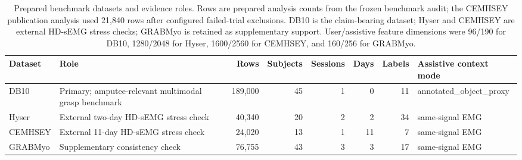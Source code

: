 \begin{table}[!t]
\centering
\caption{Prepared benchmark datasets and evidence roles. Rows are prepared analysis counts from the frozen benchmark audit; the CEMHSEY publication analysis used 21{,}840 rows after configured failed-trial exclusions. DB10 is the claim-bearing dataset; Hyser and CEMHSEY are external HD-sEMG stress checks; GRABMyo is retained as supplementary support. User/assistive feature dimensions were 96/190 for DB10, 1280/2048 for Hyser, 1600/2560 for CEMHSEY, and 160/256 for GRABMyo.}
\label{tab:datasets}
\footnotesize
\begin{tabular}{p{}p{}rrrrrp{}}
\toprule
Dataset & Role & Rows & Subjects & Sessions & Days & Labels & Assistive context mode \\
\midrule
DB10 & Primary; amputee-relevant multimodal grasp benchmark & 189,000 & 45 & 1 & 0 & 11 & annotated\_object\_proxy \\
Hyser & External two-day HD-sEMG stress check & 40,340 & 20 & 2 & 2 & 34 & same-signal EMG \\
CEMHSEY & External 11-day HD-sEMG stress check & 24,020 & 13 & 1 & 11 & 7 & same-signal EMG \\
GRABMyo & Supplementary consistency check & 76,755 & 43 & 3 & 3 & 17 & same-signal EMG \\
\bottomrule
\end{tabular}
\end{table}
